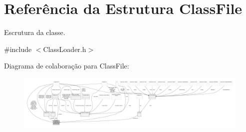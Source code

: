 \hypertarget{structClassFile}{}\section{Referência da Estrutura Class\+File}
\label{structClassFile}


Escrutura da classe.  




{\ttfamily \#include $<$Class\+Loader.\+h$>$}



Diagrama de colaboração para Class\+File\+:\nopagebreak
\begin{figure}[H]
\begin{center}
\leavevmode
\includegraphics[width=350pt]{structClassFile__coll__graph}
\end{center}
\end{figure}
